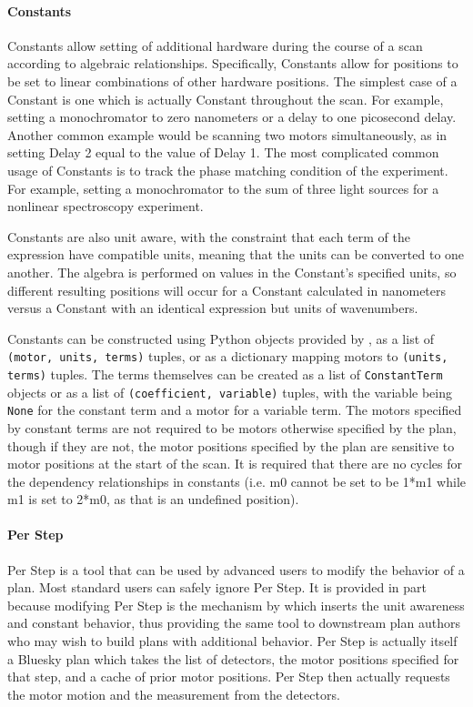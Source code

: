 \paragraph{Constants}

Constants allow setting of additional hardware during the course of a scan according to algebraic relationships.
Specifically, Constants allow for positions to be set to linear combinations of other hardware positions.
The simplest case of a Constant is one which is actually Constant throughout the scan.
For example, setting a monochromator to zero nanometers or a delay to one picosecond delay.
Another common example would be scanning two motors simultaneously, as in setting Delay 2 equal to the value of Delay 1.
The most complicated common usage of Constants is to track the phase matching condition of the experiment.
For example, setting a monochromator to the sum of three light sources for a nonlinear spectroscopy experiment.

Constants are also unit aware, with the constraint that each term of the expression have compatible units, meaning that the units can be converted to one another.
The algebra is performed on values in the Constant's specified units, so different resulting positions will occur for a Constant calculated in nanometers versus a Constant with an identical expression but units of wavenumbers.

Constants can be constructed using Python objects provided by \wrightplans, as a list of \texttt{(motor, units, terms)} tuples, or as a dictionary mapping motors to \texttt{(units, terms)} tuples.
The terms themselves can be created as a list of \texttt{ConstantTerm} objects or as a list of \texttt{(coefficient, variable)} tuples, with the variable being \texttt{None} for the constant term and a motor for a variable term.
The motors specified by constant terms are not required to be motors otherwise specified by the plan, though if they are not, the motor positions specified by the plan are sensitive to motor positions at the start of the scan.
It is required that there are no cycles for the dependency relationships in constants (i.e. m0 cannot be set to be 1*m1 while m1 is set to 2*m0, as that is an undefined position).

\paragraph{Per Step}

Per Step is a tool that can be used by advanced users to modify the behavior of a plan.
Most standard users can safely ignore Per Step.
It is provided in part because modifying Per Step is the mechanism by which \wrightplans inserts the unit awareness and constant behavior, thus providing the same tool to downstream plan authors who may wish to build plans with additional behavior.
Per Step is actually itself a Bluesky plan which takes the list of detectors, the motor positions specified for that step, and a cache of prior motor positions.
Per Step then actually requests the motor motion and the measurement from the detectors.

